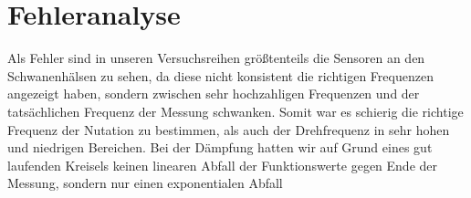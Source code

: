 \documentclass{include/protokollclass}
\begin{document}
\chapter{Fehleranalyse}
Als Fehler sind in unseren Versuchsreihen größtenteils die Sensoren an den Schwanenhälsen zu sehen, da diese nicht konsistent die richtigen Frequenzen angezeigt haben, sondern zwischen sehr hochzahligen Frequenzen und der tatsächlichen Frequenz der Messung schwanken. Somit war es schierig die richtige Frequenz der Nutation zu bestimmen, als auch der Drehfrequenz in sehr hohen und niedrigen Bereichen. Bei der Dämpfung hatten wir auf Grund eines gut laufenden Kreisels keinen linearen Abfall der Funktionswerte gegen Ende der Messung, sondern nur einen exponentialen Abfall


\end{document}
